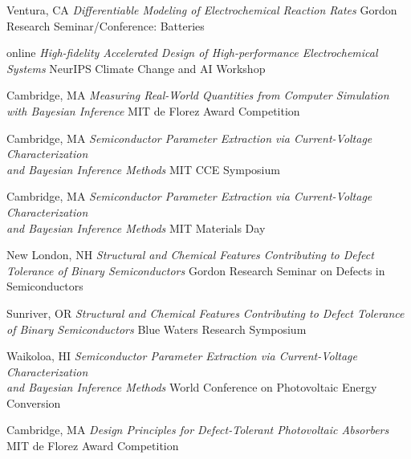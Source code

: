     {Ventura, CA}
    {\textit{Differentiable Modeling of Electrochemical Reaction Rates}}
    {Gordon Research Seminar/Conference: Batteries}

\vspace{\talkyearsep}
    {online}
    {\textit{High-fidelity Accelerated Design of High-performance Electrochemical Systems}}
    {NeurIPS Climate Change and AI Workshop}

\vspace{\talkyearsep}
    {Cambridge, MA}
    {\textit{Measuring Real-World Quantities from Computer Simulation with Bayesian Inference}}
    {MIT de Florez Award Competition}

\vspace{\talksep}
\datedsubsection{}
    {Cambridge, MA}
    {\textit{Semiconductor Parameter Extraction via Current-Voltage Characterization \\and Bayesian Inference Methods}}
    {MIT CCE Symposium}

\vspace{\talkyearsep}
    {Cambridge, MA}
    {\textit{Semiconductor Parameter Extraction via Current-Voltage Characterization \\and Bayesian Inference Methods}}
    {MIT Materials Day}

\vspace{\talksep}
\datedsubsection{}
    {New London, NH}
    {\textit{Structural and Chemical Features Contributing to Defect Tolerance of Binary Semiconductors}}
    {Gordon Research Seminar on Defects in Semiconductors}

\vspace{\talksep}
\datedsubsection{}
    {Sunriver, OR}
    {\textit{Structural and Chemical Features Contributing to Defect Tolerance of Binary Semiconductors}}
    {Blue Waters Research Symposium}

\vspace{\talksep}
\datedsubsection{}
    {Waikoloa, HI}
    {\textit{Semiconductor Parameter Extraction via Current-Voltage Characterization \\and Bayesian Inference Methods}}
    {World Conference on Photovoltaic Energy Conversion}

\vspace{\talksep}
\datedsubsection{}
    {Cambridge, MA}
    {\textit{Design Principles for Defect-Tolerant Photovoltaic Absorbers}}
    {MIT de Florez Award Competition}

